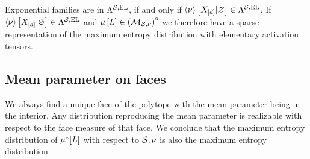 \documentclass[aps,onecolumn,nofootinbib,pra]{article}
\begin{document}
    Exponential families are in $\Lambda^{\mathcal{S},\mathrm{EL}}$, if and only if $\left\langle \nu\right\rangle \left[ X_{[d]} | \varnothing \right]\in\Lambda^{\mathcal{S},\mathrm{EL}}$.
    If $\left\langle \nu\right\rangle \left[ X_{[d]} | \varnothing \right]\in\Lambda^{\mathcal{S},\mathrm{EL}}$ and $\mu\left[L\right] \in {\left(\mathcal{M}_{\mathcal{S},\nu}\right)}^{\circ} $ we therefore have a sparse representation of the maximum entropy distribution with elementary activation tensors.

    \subsection{Mean parameter on faces}

    We always find a unique face of the polytope with the mean parameter being in the interior.
    Any distribution reproducing the mean parameter is realizable with respect to the face measure of that face.
    We conclude that the maximum entropy distribution of $\mu^*[L]$ with respect to $\mathcal{S},\nu$ is also the maximum entropy distribution
\end{document}

